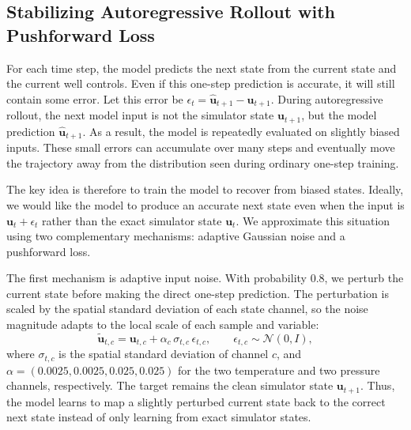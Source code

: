 \documentclass[pdflatex,sn-mathphys-ay]{sn-jnl}
\newcommand{\svec}{\mathbf{u}}            %
\begin{document}
\subsection{Stabilizing Autoregressive Rollout with Pushforward Loss}
For each time step, the model predicts the next state from the current state and
the current well controls. Even if this one-step prediction is accurate, it will
still contain some error. Let this error be
\(\epsilon_t=\hat{\svec}_{t+1}-\svec_{t+1}\). During autoregressive rollout,
the next model input is not the simulator state \(\svec_{t+1}\), but the model
prediction \(\hat{\svec}_{t+1}\). As a result, the model is repeatedly evaluated
on slightly biased inputs. These small errors can accumulate over many steps and
eventually move the trajectory away from the distribution seen during ordinary
one-step training.

The key idea is therefore to train the model to recover from biased states. Ideally,
 we would like the model to produce an accurate next state even when
the input is \(\svec_t+\epsilon_t\) rather than the exact simulator state
\(\svec_t\). We approximate this situation using two complementary mechanisms:
adaptive Gaussian noise and a pushforward loss.

The first mechanism is adaptive input noise. With probability 0.8, we perturb the
current state before making the direct one-step prediction. The perturbation is
scaled by the spatial standard deviation of each state channel, so the noise
magnitude adapts to the local scale of each sample and variable:
\begin{equation}
  \tilde{\svec}_{t,c}
  =
  \svec_{t,c}
  +
  \alpha_c\,\sigma_{t,c}\,\epsilon_{t,c},
  \qquad
  \epsilon_{t,c}\sim\mathcal{N}(0,I),
  \label{eq:adaptive-noise}
\end{equation}
where \(\sigma_{t,c}\) is the spatial standard deviation of channel \(c\), and
\(\alpha=(0.0025,0.0025,0.025,0.025)\) for the two temperature and two pressure
channels, respectively. The target remains the clean simulator state
\(\svec_{t+1}\). Thus, the model learns to map a slightly perturbed current
state back to the correct next state instead of only learning from exact
simulator states.
\end{document}
